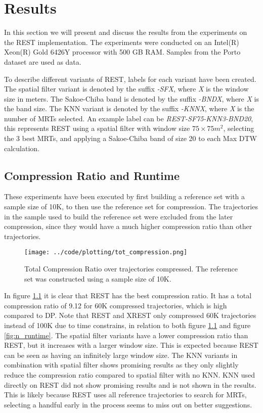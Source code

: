 \chapter{Results}
\label{chap:res}
In this section we will present and discuss the results from the experiments on the REST implementation. The experiments were conducted on an Intel(R) Xeon(R) Gold 6426Y processor with 500 GB RAM. Samples from the Porto dataset are used as data.

To describe different variants of REST, labels for each variant have been created. The spatial filter variant is denoted by the suffix \textit{-SFX}, where \textit{X} is the window size in meters. The Sakoe-Chiba band is denoted by the suffix \textit{-BNDX}, where \textit{X} is the band size. The KNN variant is denoted by the suffix \textit{-KNNX}, where \textit{X} is the number of MRTs selected. An example label can be \textit{REST-SF75-KNN3-BND20}, this represents REST using a spatial filter with window size $75\times75 m^2$, selecting the 3 best MRTs, and applying a Sakoe-Chiba band of size 20 to each Max DTW calculation.

\section{Compression Ratio and Runtime}
These experiments have been executed by first building a reference set with a sample size of 10K, to then use the reference set for compression. The trajectories in the sample used to build the reference set were excluded from the later compression, since they would have a much higher compression ratio than other trajectories.

\begin{figure}[h]
    \begin{minipage}{0.99\linewidth}
        \centering
        \texttt{[image: ../code/plotting/tot\_compression.png]}
        \caption{Total Compression Ratio over trajectories compressed. The reference set was constructed using a sample size of 10K.}
        \label{fig:n_compression}
    \end{minipage}
\end{figure}

In figure \ref{fig:n_compression} it is clear that REST has the best compression ratio. It has a total compression ratio of 9.12 for 60K compressed trajectories, which is high compared to DP. Note that REST and XREST only compressed 60K trajectories instead of 100K due to time constrains, in relation to both figure \ref{fig:n_compression} and figure \ref{fig:n_runtime}. The spatial filter variants have a lower compression ratio than REST, but it increases with a larger window size. This is expected because REST can be seen as having an infinitely large window size. The KNN variants in combination with spatial filter shows promising results as they only slightly reduce the compression ratio compared to spatial filter with no KNN. KNN used directly on REST did not show promising results and is not shown in the results. This is likely because REST uses all reference trajectories to search for MRTs, selecting a handful early in the process seems to miss out on better suggestions.

